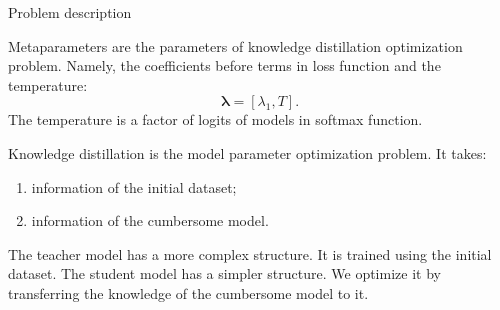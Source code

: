 \documentclass[12pt, aspectratio=169]{beamer}
\begin{document}
\begin{frame}{Problem description}

    {\color{red}Metaparameters} \boldsymbol{\lambda} are the parameters of knowledge distillation optimization problem. Namely, the coefficients before terms in loss function and the temperature: 
    $$\boldsymbol{\lambda} = [\lambda_1, T].$$
    The temperature is a factor of logits of models in softmax function.
    
    \vspace{0.2 cm}
    
    {\color{red}Knowledge distillation} is the model parameter optimization problem. It takes:
    \begin{enumerate}
        \item information of the initial dataset;
        \item information of the cumbersome model.
    \end{enumerate}
    
    \vspace{0.2 cm}
    
    The {\color{red}teacher model} has a more complex structure. It is trained using the initial dataset. The {\color{red}student model} has a simpler structure. We optimize it by transferring the knowledge of the cumbersome model to it.
    
\end{frame}





\end{document}
